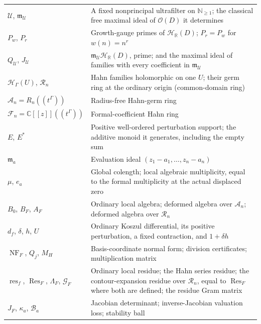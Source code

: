 \documentclass[11pt,letterpaper]{article}
\theoremstyle{definition}
\theoremstyle{remark}
\newcommand{\C}{\mathbb C}
\newcommand{\R}{\mathbb R}
\newcommand{\N}{\mathbb N}
\newcommand{\A}{\mathscr A}
\newcommand{\RR}{\mathscr R}
\newcommand{\FF}{\mathscr F}
\newcommand{\HH}{\mathcal H}
\newcommand{\UU}{\mathcal U}
\newcommand{\m}{\mathfrak m}
\newcommand{\OO}{\mathcal O}
\newcommand{\Res}{\operatorname{Res}}
\newcommand{\res}{\operatorname{res}}
\newcommand{\NF}{\operatorname{NF}}
\numberwithin{equation}{section}
\begin{document}
\begin{center}
\begin{longtable}{@{}L{0.24\textwidth}L{0.68\textwidth}@{}}
$\UU$, $\m_\UU$ & A fixed nonprincipal ultrafilter on $\N_{\ge1}$; the
classical free maximal ideal of $\OO(D)$ it determines\\[0.3em]
$P_w$, $P_r$ & Growth-gauge primes of $\HH_\R(D)$; $P_r=P_w$ for
$w(n)=n^r$\\[0.3em]
$Q_\UU$, $J_\UU$ & $\m_\UU\HH_\R(D)$, prime; and the maximal ideal of
families with every coefficient in $\m_\UU$\\[0.3em]
$\HH_\Gamma(U)$, $\RR_n$ & Hahn families holomorphic on one $U$; their germ
ring at the ordinary origin (common-domain ring)\\[0.3em]
$\A_n=R_n((t^\Gamma))$ & Radius-free Hahn-germ ring\\[0.3em]
$\FF_n=\C[[z]]((t^\Gamma))$ & Formal-coefficient Hahn ring\\[0.3em]
$E$, $E^*$ & Positive well-ordered perturbation support; the additive monoid
it generates, including the empty sum\\[0.3em]
$\m_a$ & Evaluation ideal $(z_1-a_1,\ldots,z_n-a_n)$\\[0.3em]
$\mu$, $e_a$ & Global colength; local algebraic multiplicity, equal to the
formal multiplicity at the actual displaced zero\\[0.3em]
$B_0$, $B_F$, $A_F$ & Ordinary local algebra; deformed algebra over $\A_n$;
deformed algebra over $\RR_n$\\[0.3em]
$d_f$, $\delta$, $h$, $U$ & Ordinary Koszul differential, its positive
perturbation, a fixed contraction, and $1+\delta h$\\[0.3em]
$\NF_F$, $Q_j$, $M_H$ & Basis-coordinate normal form; division certificates;
multiplication matrix\\[0.3em]
$\res_f$, $\Res_F$, $\Lambda_F$, $\mathcal G_F$ & Ordinary local residue;
the Hahn series residue; the contour-expansion residue over $\RR_n$, equal
to $\Res_F$ where both are defined; the residue Gram matrix\\[0.3em]
$J_F$, $\kappa_a$, $\mathcal B_a$ & Jacobian determinant; inverse-Jacobian
valuation loss; stability ball\\
\bottomrule
\end{longtable}
\end{center}
\end{document}
